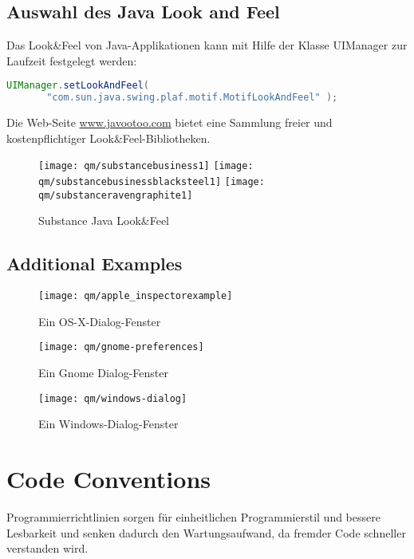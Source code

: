 \subsection{Auswahl des Java Look and Feel}
%
Das Look\&Feel von Java-Applikationen kann mit Hilfe
der Klasse UIManager zur Laufzeit festgelegt werden:
\begin{lstlisting}[language=java]
  UIManager.setLookAndFeel(
       "com.sun.java.swing.plaf.motif.MotifLookAndFeel" );
\end{lstlisting}
Die Web-Seite \href{http://www.javootoo.com}{www.javootoo.com}
bietet eine Sammlung freier und kostenpflichtiger
Look\&Feel-Bibliotheken.
\begin{figure}[H]
  \texttt{[image: qm/substancebusiness1]}
\hfill
  \texttt{[image: qm/substancebusinessblacksteel1]}
\hfill
  \texttt{[image: qm/substanceravengraphite1]}
  \caption{Substance Java Look\&Feel}
  \label{fig:substance}
\end{figure}

\subsection{Additional Examples}
\begin{minipage}{0.4\linewidth}
\begin{figure}[H]
\begin{center}
\texttt{[image: qm/apple\_inspectorexample]}
\caption{Ein OS-X-Dialog-Fenster}
\end{center}
\end{figure}
\end{minipage}
\hfill
\begin{minipage}{0.58\linewidth}
\begin{figure}[H]
\texttt{[image: qm/gnome-preferences]}
\caption{Ein Gnome Dialog-Fenster}
\end{figure}
\end{minipage}
\begin{figure}[H]
\begin{center}
\texttt{[image: qm/windows-dialog]}
\caption{Ein Windows-Dialog-Fenster}
\end{center}
\end{figure}
%
%
\section{Code Conventions}
Programmierrichtlinien sorgen für einheitlichen Programmierstil und bessere
Lesbarkeit und senken dadurch den Wartungsaufwand, da fremder Code
schneller verstanden wird.

